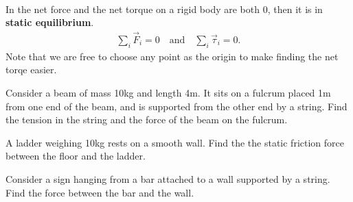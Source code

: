 \documentclass[../classical_mechanics.tex]{subfiles}
\begin{document}
        \paragraph{}
        In the net force and the net torque on a rigid body are both 0, then it is in \textbf{static equilibrium}.
        \begin{eqnarray}
            \sum_i\vec{F}_i=0\quad\text{and}\quad\sum_i\vec{\tau}_i=0.
        \end{eqnarray}
        Note that we are free to choose any point as the origin to make finding the net torqe easier.
        \begin{example}
            Consider a beam of mass 10kg and length 4m.
            It sits on a fulcrum placed 1m from one end of the beam, and is supported from the other end by a string.
            Find the tension in the string and the force of the beam on the fulcrum.
        \end{example}
        \begin{example}
            A ladder weighing 10kg rests on a smooth wall.
            Find the the static friction force between the floor and the ladder.
        \end{example}
        \begin{example}
            Consider a sign hanging from a bar attached to a wall supported by a string.
            Find the force between the bar and the wall.
        \end{example}
\end{document}
